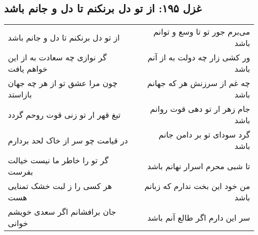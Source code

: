 \begin{center}
\section*{غزل ۱۹۵: از تو دل برنکنم تا دل و جانم باشد}
\label{sec:195}
\begin{longtable}{l p{0.5cm} r}
از تو دل برنکنم تا دل و جانم باشد
&&
می‌برم جور تو تا وسع و توانم باشد
\\
گر نوازی چه سعادت به از این خواهم یافت
&&
ور کشی زار چه دولت به از آنم باشد
\\
چون مرا عشق تو از هر چه جهان بازاستد
&&
چه غم از سرزنش هر که جهانم باشد
\\
تیغ قهر ار تو زنی قوت روحم گردد
&&
جام زهر ار تو دهی قوت روانم باشد
\\
در قیامت چو سر از خاک لحد بردارم
&&
گرد سودای تو بر دامن جانم باشد
\\
گر تو را خاطر ما نیست خیالت بفرست
&&
تا شبی محرم اسرار نهانم باشد
\\
هر کسی را ز لبت خشک تمنایی هست
&&
من خود این بخت ندارم که زبانم باشد
\\
جان برافشانم اگر سعدی خویشم خوانی
&&
سر این دارم اگر طالع آنم باشد
\\
\end{longtable}
\end{center}
